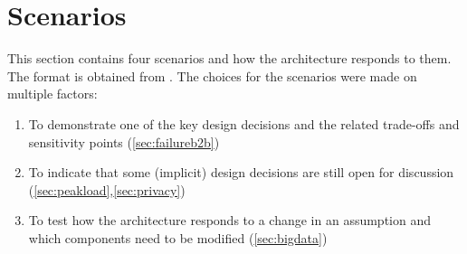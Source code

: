 \section{Scenarios}

This section contains four scenarios and how the architecture responds to them. The format is obtained from \cite{clemens}. The choices for the scenarios were made on multiple factors:
\begin{enumerate}
\itemsep0em 
\item To demonstrate one of the key design decisions and the related trade-offs and sensitivity points (\ref{sec:failureb2b})
\item To indicate that some (implicit) design decisions are still open for discussion (\ref{sec:peakload},\ref{sec:privacy})
\item To test how the architecture responds to a change in an assumption and which components need to be modified (\ref{sec:bigdata})
\end{enumerate}

